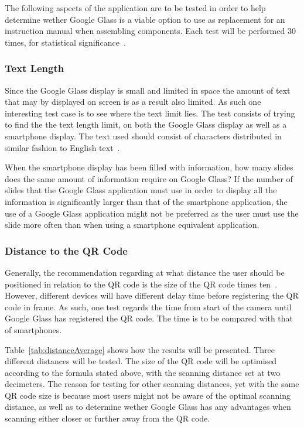 The following aspects of the application are to be tested in order to help determine wether Google Glass is a viable option to use as replacement for an instruction manual when assembling components. Each test will be performed 30 times, for statistical significance~\cite{30sampleSize}.

\subsubsection{Text Length}
Since the Google Glass display is small and limited in space the amount of text that may by displayed on screen is as a result also limited. As such one interesting test case is to see where the text limit lies. The test consists of trying to find the the text length limit, on both the Google Glass display as well as a smartphone display. The text used should consist of characters distributed in similar fashion to English text~\cite{englishTextStat}.

When the smartphone display has been filled with information, how many slides does the same amount of information require on Google Glass? If the number of slides that the Google Glass application must use in order to display all the information is significantly larger than that of the smartphone application, the use of a Google Glass application might not be preferred as the user must use the slide more often than when using a smartphone equivalent application.



\subsubsection{Distance to the QR Code}
Generally, the recommendation regarding at what distance the user should be positioned in relation to the QR code is the size of the QR code times ten~\cite{qrCodeSizeComplexity}. However, different devices will have different delay time before registering the QR code in frame. As such, one test regards the time from start of the camera until Google Glass has registered the QR code. The time is to be compared with that of smartphones.

Table~\ref{tab:distanceAverage} shows how the results will be presented. Three different distances will be tested. The size of the QR code will be optimised according to the formula stated above, with the scanning distance set at two decimeters. The reason for testing for other scanning distances, yet with the same QR code size is because most users might not be aware of the optimal scanning distance, as well as to determine wether Google Glass has any advantages when scanning either closer or further away from the QR code.

